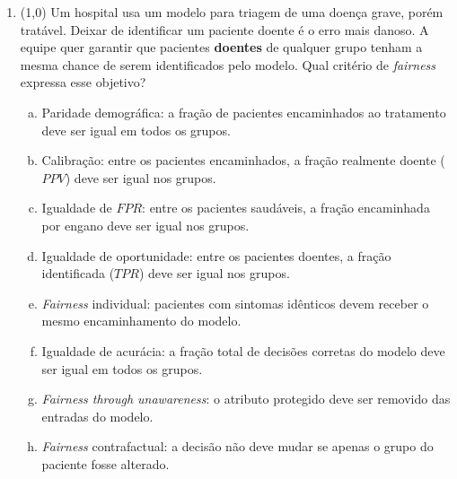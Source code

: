 \documentclass[11pt,a4paper]{article}
\begin{document}
\begin{enumerate}[1)]
\begin{enumerate}[a)]
    \item 1-(ii); -(iii); -(i); -(iv)
    \item 1-(v); -(i); -(iii); -(iv)
    \item 1-(v); -(iii); -(iv); -(i)
    \item 1-(ii); -(v); -(i); -(iv)
    \item 1-(v); -(ii); -(i); -(iv)
    \item 1-(iii); -(v); -(iv); -(i)
    \item 1-(v); -(iii); -(i); -(iv)
    \item 1-(v); -(iii); -(ii); -(iv)
\end{enumerate}

\item (1{,}0) Um hospital usa um modelo para triagem de uma doença grave, porém tratável. Deixar de identificar um paciente doente é o erro mais danoso. A equipe quer garantir que pacientes \textbf{doentes} de qualquer grupo tenham a mesma chance de serem identificados pelo modelo. Qual critério de \textit{fairness} expressa esse objetivo?

\begin{enumerate}[a)]
    \item Paridade demográfica: a fração de pacientes encaminhados ao tratamento deve ser igual em todos os grupos.
    \item Calibração: entre os pacientes encaminhados, a fração realmente doente ($PPV$) deve ser igual nos grupos.
    \item Igualdade de $FPR$: entre os pacientes saudáveis, a fração encaminhada por engano deve ser igual nos grupos.
    \item Igualdade de oportunidade: entre os pacientes doentes, a fração identificada ($TPR$) deve ser igual nos grupos.
    \item \textit{Fairness} individual: pacientes com sintomas idênticos devem receber o mesmo encaminhamento do modelo.
    \item Igualdade de acurácia: a fração total de decisões corretas do modelo deve ser igual em todos os grupos.
    \item \textit{Fairness through unawareness}: o atributo protegido deve ser removido das entradas do modelo.
    \item \textit{Fairness} contrafactual: a decisão não deve mudar se apenas o grupo do paciente fosse alterado.
\end{enumerate}


\end{enumerate}
\end{document}
